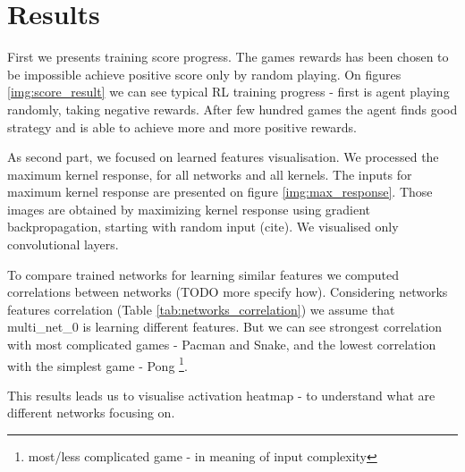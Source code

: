 \documentclass[10pt,a4paper]{article}
\begin{document}
\newpage
\section{Results}

First we presents training score progress. The games rewards has been chosen to
be impossible achieve positive score only by random playing. On figures \ref{img:score_result} we
can see typical RL training progress - first is agent playing randomly, taking negative rewards.
After few hundred games the agent finds good strategy and is able to achieve more and more positive
rewards.

As second part, we focused on learned features visualisation. We processed the maximum kernel response, for
all networks and all kernels. The inputs for maximum kernel response are presented on figure \ref{img:max_response}.
Those images are obtained by maximizing kernel response using gradient backpropagation, starting with random input (cite). We
visualised only convolutional layers.

To compare trained networks for learning similar features we computed correlations between networks (TODO more specify how).
Considering networks features correlation (Table \ref{tab:networks_correlation}) we assume that
multi\_net\_0 is learning different features. But we can see strongest correlation with most complicated games - Pacman and Snake,
and the lowest correlation with the simplest game - Pong \footnote{most/less complicated game - in meaning of input complexity}.

This results leads us to visualise activation heatmap - to understand what are different networks focusing on.
\end{document}
